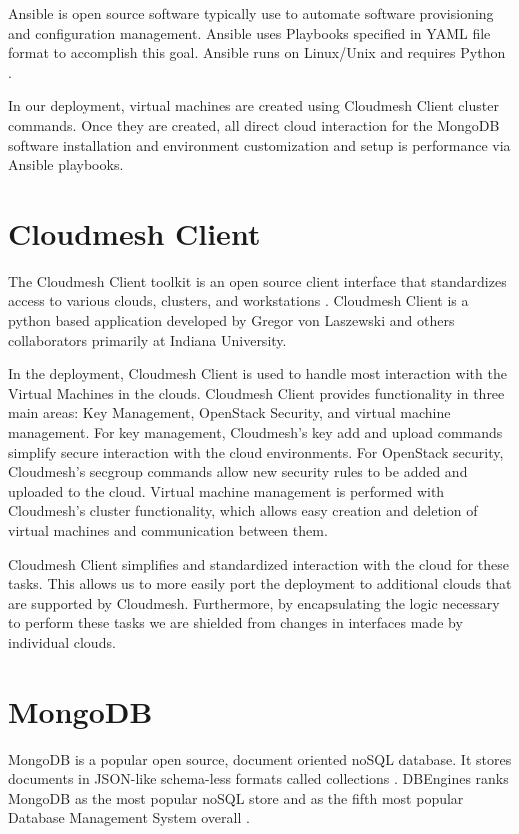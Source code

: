 \documentclass[9pt,twocolumn,twoside]{../../styles/osajnl}
\begin{document}
Ansible is open source software typically use to automate software
provisioning and configuration management. Ansible uses Playbooks
specified in YAML file format to accomplish this goal. Ansible runs on
Linux/Unix and requires Python \cite{www-wikiAnsible}.

In our deployment, virtual machines are created using Cloudmesh Client
cluster commands. Once they are created, all direct cloud interaction
for the MongoDB software installation and environment customization
and setup is performance via Ansible playbooks.



\section{Cloudmesh Client}

The Cloudmesh Client toolkit is an open source client interface that
standardizes access to various clouds, clusters, and workstations
\cite{www-cloudmesh}. Cloudmesh Client is a python based application
developed by Gregor von Laszewski and others collaborators primarily
at Indiana University.

In the deployment, Cloudmesh Client is used to handle most interaction
with the Virtual Machines in the clouds. Cloudmesh Client provides
functionality in three main areas: Key Management, OpenStack Security,
and virtual machine management. For key management, Cloudmesh's key
add and upload commands simplify secure interaction with the cloud
environments. For OpenStack security, Cloudmesh's secgroup commands
allow new security rules to be added and uploaded to the cloud.
Virtual machine management is performed with Cloudmesh's cluster
functionality, which allows easy creation and deletion of virtual
machines and communication between them.

Cloudmesh Client simplifies and standardized interaction with the
cloud for these tasks. This allows us to more easily port the
deployment to additional clouds that are supported by Cloudmesh.
Furthermore, by encapsulating the logic necessary to perform these
tasks we are shielded from changes in interfaces made by individual
clouds.

\section{MongoDB}

MongoDB is a popular open source, document oriented noSQL database. It
stores documents in JSON-like schema-less formats called collections
\cite{www-MonWiki}. DBEngines ranks MongoDB as the most popular noSQL
store and as the fifth most popular Database Management System overall
\cite{www-dbEngines}.
\end{document}
